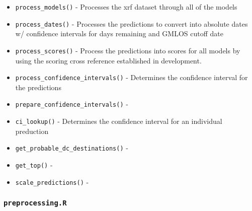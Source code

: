 \documentclass[
]{book}
\providecommand{\tightlist}{%
  \setlength{\itemsep}{0pt}\setlength{\parskip}{0pt}}
\begin{document}
\begin{itemize}
\tightlist
\item
  \texttt{process\_models()} - Processes the xrf dataset through all of the models
\item
  \texttt{process\_dates()} - Processes the predictions to convert into absolute dates w/ confidence intervals for days remaining and GMLOS cutoff date
\item
  \texttt{process\_scores()} - Process the predictions into scores for all models by using the scoring cross reference established in development.
\item
  \texttt{process\_confidence\_intervals()} - Determines the confidence interval for the predictions
\item
  \texttt{prepare\_confidence\_intervals()} -
\item
  \texttt{ci\_lookup()} - Determines the confidence interval for an individual preduction
\item
  \texttt{get\_probable\_dc\_destinations()} -
\item
  \texttt{get\_top()} -
\item
  \texttt{scale\_predictions()} -
\end{itemize}

\hypertarget{preprocessing.r-1}{%
\subsubsection{\texorpdfstring{\texttt{preprocessing.R}}{preprocessing.R}}\label{preprocessing.r-1}}
\end{document}
